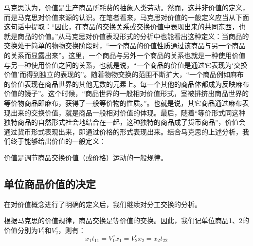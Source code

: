 马克思认为，价值是生产商品所耗费的抽象人类劳动\cite[51]{ZhongGongZhongYangMaKeSiEnGeSiLieNingSiDaLinZhuZuoBianYiJuMaKeSiEnGeSiWenJiDi5Juan2009}。然而，这并非价值的定义，而是马克思对价值来源的认识。在笔者看来，马克思对价值的一般定义应当从下面这句话中提取：“因此，在商品的交换关系或交换价值中表现出来的共同东西，也就是商品的价值。”\cite[51]{ZhongGongZhongYangMaKeSiEnGeSiLieNingSiDaLinZhuZuoBianYiJuMaKeSiEnGeSiWenJiDi5Juan2009}从马克思对价值表现形式的分析中也能看出这种定义：当商品的交换处于简单的物物交换阶段时，“一个商品的价值性质通过该商品与另一个商品的关系而显露出来”\cite[65]{ZhongGongZhongYangMaKeSiEnGeSiLieNingSiDaLinZhuZuoBianYiJuMaKeSiEnGeSiWenJiDi5Juan2009}。这里，一个商品与另外一个商品的关系也就是一种使用价值与另一种使用价值之间的关系，也就是说，“一个商品的价值是通过它表现为‘交换价值’而得到独立的表现的”\cite[76]{ZhongGongZhongYangMaKeSiEnGeSiLieNingSiDaLinZhuZuoBianYiJuMaKeSiEnGeSiWenJiDi5Juan2009}。随着物物交换的范围不断扩大，“一个商品例如麻布的价值表现在商品世界的其他无数的元素上。每一个其他的商品体都成为反映麻布价值的镜子”\cite[78]{ZhongGongZhongYangMaKeSiEnGeSiLieNingSiDaLinZhuZuoBianYiJuMaKeSiEnGeSiWenJiDi5Juan2009}。这个时候，“商品世界的一般相对价值形式，室被排挤出商品世界的等价物商品即麻布，获得了一般等价物的性质。”\cite[83]{ZhongGongZhongYangMaKeSiEnGeSiLieNingSiDaLinZhuZuoBianYiJuMaKeSiEnGeSiWenJiDi5Juan2009}。也就是说，其它商品通过麻布表现出来的交换价值，就是商品一般相对价值的体现。最后，随着“等价形式同这种独特商品的自然形式社会地结合在一起，这种独特的商品成了货币商品”\cite[86]{ZhongGongZhongYangMaKeSiEnGeSiLieNingSiDaLinZhuZuoBianYiJuMaKeSiEnGeSiWenJiDi5Juan2009}，价值会通过货币形式表现出来，即通过价格的形式表现出来。结合马克思的上述分析，我们终于能够给出价值的一般定义：
\begin{definition}
    价值是调节商品交换价值（或价格）运动的一般规律\cite[6]{CaiJiMingCongXiaYiJieZhiLunDaoGuangYiJieZhiLunXiuDingBan2022}。
\end{definition}

\subsection{单位商品价值的决定}

在对价值概念进行了明确的定义后，我们继续对分工交换的分析。

根据马克思的价值规律，商品交换是等价值的交换。因此，我们记单位商品1、2的价值分别为$V^c_1$和$V^c_2$，则有\cite[70]{CaiJiMingCongXiaYiJieZhiLunDaoGuangYiJieZhiLunXiuDingBan2022}：
\begin{equation}
    \label{dengjiajiaohuan}
    x_1 t_{11} = V^c_1 x_1 = V^c_2 x_2 = x_2 t_{22}
\end{equation}

